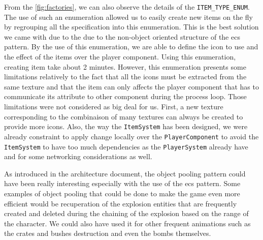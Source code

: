 From the \autoref{fig:factories}, we can also observe the details of the \texttt{ITEM_TYPE_ENUM}. The use of such an enumeration allowed us to easily create new items on the fly by regrouping all the specification into this enumeration. This is the best solution we came with due to the due to the non-object oriented structure of the \gls{ecs} pattern.
By the use of this enumeration, we are able to define the icon to use and the effect of the items over the player component. Using this enumeration, creating item take about 2 minutes. However, this enumeration presents some limitations relatively to the fact that all the icons must be extracted from the same texture and that the item can only affects the player component that has to communicate its attribute to other component during the process loop. Those limitations were not considered as big deal for us. First, a new texture corresponding to the combinaison of many textures can always be created to provide more icons. Also, the way the \texttt{ItemSystem} has been designed, we were already constraint to apply change locally over the \texttt{PlayerComponent} to avoid the \texttt{ItemSystem} to have too much dependencies as the \texttt{PlayerSystem} already have and for some networking considerations as well.

As introduced in the architecture document, the object pooling pattern could have been really interesting especially with the use of the \gls{ecs} pattern. Some examples of object pooling that could be done to make the game even more efficient would be recuperation of the explosion entities that are frequently created and deleted during the chaining of the explosion based on the range of the character. We could also have used it for other frequent animations such as the crates and bushes destruction and even the bombs themselves.
